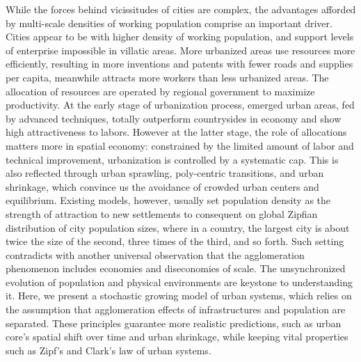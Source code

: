 \documentclass[reprint,unsortedaddress,amsmath,amssymb,aps,prl,showkeys]{revtex4-2}
\begin{document}
While the forces behind vicissitudes of cities are complex, the advantages afforded by multi-scale densities of working population comprise an important driver\cite{smith1937wealth,fujita1999spatial}. Cities appear to be with higher density of working population, and support levels of enterprise impossible in villatic areas. More urbanized areas use resources more efficiently, resulting in more inventions and patents with fewer roads and supplies per capita\cite{fujita1999spatial,becker1999population,bettencourt2007growth}, meanwhile attracts more workers than less urbanized areas. The allocation of resources are operated by regional government to maximize productivity. At the early stage of urbanization process, emerged urban areas, fed by advanced techniques, totally outperform countrysides in economy and show high attractiveness to labors. However at the latter stage, the role of allocations matters more in spatial economy: constrained by the limited amount of labor and technical improvement, urbanization is controlled by a systematic cap. This is also reflected through urban sprawling, poly-centric transitions, and urban shrinkage, which convince us the avoidance of crowded urban centers and equilibrium. Existing models, however, usually set population density as the strength of attraction to new settlements\cite{PhysRevX.4.011008,PhysRevLett.79.523,foster2010communities,pan2013urban,Li2017Simple} to consequent on global Zipfian distribution of city population sizes\cite{zipf1949human}, where in a country, the largest city is about twice the size of the second, three times of the third, and so forth. Such setting contradicts with another universal observation that the agglomeration phenomenon includes economies and diseconomies of scale\cite{batty2019urbanscalinglaw}. The unsynchronized evolution of population and physical environments are keystone to understanding it\cite{doi:10.1177/0042098010396239,gu2001social}. Here, we present a stochastic growing model of urban systems, which relies on the assumption that agglomeration effects of infrastructures and population are separated. These principles guarantee more realistic predictions, such as urban core's spatial shift over time and urban shrinkage, while keeping vital properties such as Zipf's and Clark's law\cite{clark1951urban} of urban systems. 
\end{document}
